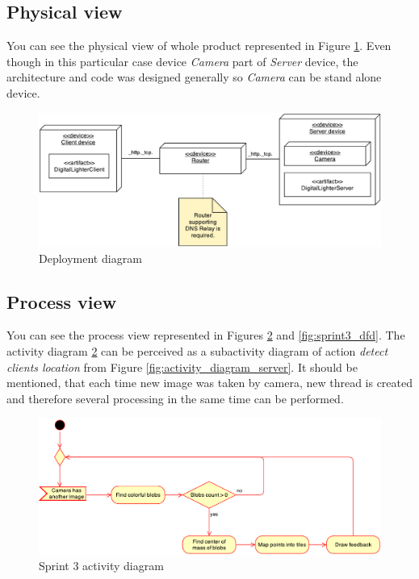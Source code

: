 \subsection{Physical view}
You can see the physical view of whole product represented in Figure \ref{fig:sprint3_deployment_diagram}.
Even though in this particular case device \emph{Camera} part of \emph{Server} device, the architecture and code was designed generally so \emph{Camera} can be stand alone device.

\begin{figure}[h]
	\centering
		\includegraphics[width=15cm]{images/deployment-diagram-sprint3}
	\caption{Deployment diagram}
	\label{fig:sprint3_deployment_diagram}
\end{figure}

\subsection{Process view}
You can see the process view represented in Figures \ref{fig:sprint3_activity_diagram} and \ref{fig:sprint3_dfd}. The activity diagram \ref{fig:sprint3_activity_diagram} can be perceived as a subactivity diagram of action \emph{detect clients location} from Figure \ref{fig:activity_diagram_server}.
It should be mentioned, that each time new image was taken by camera, new thread is created and therefore several processing in the same time can be performed.

\begin{figure}[h]
	\centering
		\includegraphics[width=16.2cm]{sprint3/activity_sprint3.pdf}
	\caption{Sprint 3 activity diagram}
	\label{fig:sprint3_activity_diagram}
\end{figure}


